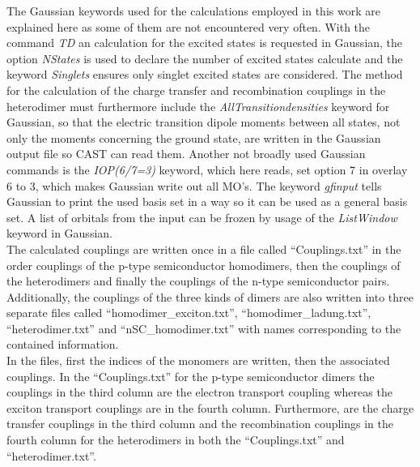 \documentclass[10pt,a4paper]{article} %
\begin{document}
The Gaussian keywords used for the calculations employed in this work are explained here as some of them are not encountered very often. With the command \textit{TD} an calculation for the excited states is requested in Gaussian, the option \textit{NStates} is used to declare the number of excited states calculate and the keyword \textit{Singlets} ensures only singlet excited states are considered. The method for the calculation of the charge transfer and recombination couplings in the heterodimer must furthermore include the \textit{AllTransitiondensities} keyword for Gaussian, so that the electric transition dipole moments between all states, not only the moments concerning the ground state, are written in the Gaussian output file so CAST can read them. Another not broadly used Gaussian commands is the \textit{IOP(6/7=3)} keyword, which here reads, set option 7 in overlay 6 to 3, which makes Gaussian write out all MO's. The keyword \textit{gfinput} tells Gaussian to print the used basis set in a way so it can be used as a general basis set. A list of orbitals from the input can be frozen by usage of the \textit{ListWindow} keyword in Gaussian.\\
The calculated couplings are written once in a file called ``Couplings.txt'' in the order couplings of the p-type semiconductor homodimers, then the couplings of the heterodimers and finally the couplings of the n-type semiconductor pairs. Additionally, the couplings of the three kinds of dimers are also written into three separate files called ``homodimer\_exciton.txt'', ``homodimer\_ladung.txt'', ``heterodimer.txt'' and ``nSC\_homodimer.txt'' with names corresponding to the contained information. \\
In the files, first the indices of the monomers are written, then the associated couplings. In the ``Couplings.txt'' for the p-type semiconductor dimers the couplings in the third column are the electron transport coupling whereas the exciton transport couplings are in the fourth column. Furthermore, are the charge transfer couplings in the third column and the recombination couplings in the fourth column for the heterodimers in both the ``Couplings.txt'' and ``heterodimer.txt''.

\end{document}
